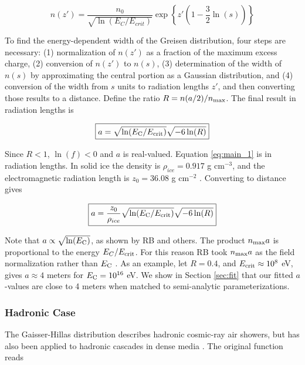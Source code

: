 \documentclass[amsmath,amssymb,aps,prd,10pt,twocolumn]{revtex4}
\begin{document}
\begin{equation}
n(z') = \frac{n_0}{\sqrt{\ln(E_C/E_{crit})}} \exp \left \lbrace z'\left(1 - \frac{3}{2}\ln(s) \right) \right \rbrace
\end{equation}

To find the energy-dependent width of the Greisen distribution, four steps are necessary: (1) normalization of $n(z')$ as a fraction of the maximum excess charge, (2) conversion of $n(z')$ to $n(s)$, (3) determination of the width of $n(s)$ by approximating the central portion as a Gaussian distribution, and (4) conversion of the width from $s$ units to radiation lengths $z'$, and then converting those results to a distance.  Define the ratio $R = n(a/2)/n_{\rm max}$.  The final result in radiation lengths is

\begin{equation}
\boxed{
a = \sqrt{\ln(E_{\rm C}/E_{\rm crit})} \sqrt{-6\ln(R)}
} \label{eq:main_1}
\end{equation}

Since $R<1$, $\ln(f)<0$ and $a$ is real-valued.  Equation \ref{eq:main_1} is in radiation lengths.  In solid ice the density is $\rho_{ice} = 0.917$ g cm$^{-3}$, and the electromagnetic radiation length is $z_0 = 36.08$ g cm$^{-2}$ \cite{10.1016/j.astropartphys.2017.03.008}.  Converting to distance gives 

\begin{equation}
\boxed{
a = \frac{z_0}{\rho_{ice}}\sqrt{\ln(E_{\rm C}/E_{\rm crit})} \sqrt{-6\ln(R)}
}
\end{equation}

Note that $a \propto \sqrt{\ln(E_{\rm C})}$, as shown by RB and others.  The product $n_{\rm max} a$ is proportional to the energy $E_C/E_{\rm crit}$.  For this reason RB took $n_{\rm max} a$ as the field normalization rather than $E_{\rm C}$ \cite{10.1103/physrevd.65.016003}.  As an example, let $R = 0.4$, and $E_{\rm crit} \approx 10^8$ eV, gives $a \approx 4$ meters for $E_{\rm C} = 10^{16}$ eV.  We show in Section \ref{sec:fit} that our fitted $a$-values are close to 4 meters when matched to semi-analytic parameterizations.

\subsubsection{Hadronic Case}

The Gaisser-Hillas distribution describes hadronic cosmic-ray air showers, but has also been applied to hadronic cascades in dense media \cite{testbed}.  The original function reads
\end{document}
